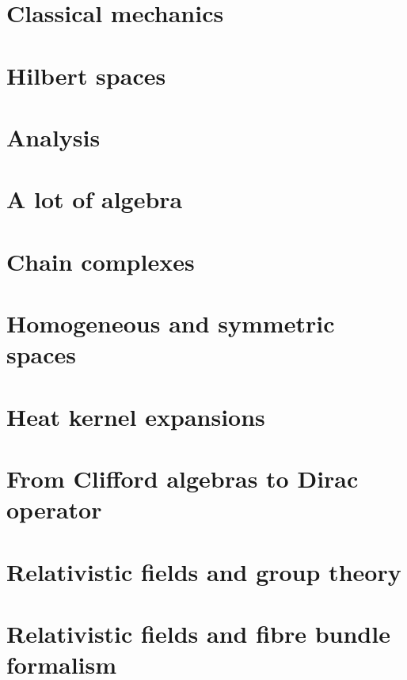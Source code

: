 \chapter{Classical mechanics}



\chapter{Hilbert spaces}



\chapter{Analysis}









\chapter{A lot of algebra}




\chapter{Chain complexes}


\chapter{Homogeneous and symmetric spaces}




\chapter{Heat kernel expansions}


\chapter{From Clifford algebras to Dirac operator}



\chapter{Relativistic fields and group theory}


\chapter{Relativistic fields and fibre bundle formalism}


